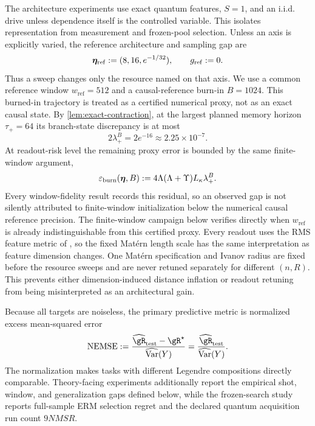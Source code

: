 The architecture experiments use exact quantum features, $S=1$, and an i.i.d.
drive unless dependence itself is the controlled variable.  This isolates
representation from measurement and frozen-pool selection.  Unless an axis is
explicitly varied, the reference architecture and sampling gap are
\begin{equation}
    \bm{\eta}_{\mathrm{ref}}:=(8,16,e^{-1/32}),
    \qquad g_{\mathrm{ref}}:=0.
    \label{eq:empirical-reference-architecture}
\end{equation}
Thus a sweep changes only the resource named on that axis.  We use a common
reference window $w_{\mathrm{ref}}=512$ and a causal-reference burn-in
$B=1024$.  This burned-in trajectory is treated as a certified numerical
proxy, not as an exact causal state.  By \cref{lem:exact-contraction}, at the
largest planned memory horizon $\tau_+=64$ its branch-state discrepancy is at
most
\[
    2\lambda_+^B=2e^{-16}\approx2.25\times10^{-7}.
\]
At readout-risk level the remaining proxy error is bounded by the same
finite-window argument,
\begin{equation}
    \varepsilon_{\mathrm{burn}}(\bm{\eta},B)
    :=4\Lambda(\Lambda+\Upsilon)L_{\kappa}\lambda_+^B.
    \label{eq:burnin-risk-residual}
\end{equation}
Every window-fidelity result records this residual, so an observed gap is not
silently attributed to finite-window initialization below the numerical causal
reference precision.  The finite-window campaign below verifies directly when
$w_{\mathrm{ref}}$ is already indistinguishable from this certified proxy.
Every readout uses the RMS feature metric of , so
the fixed Mat\'ern length scale has the same interpretation as feature
dimension changes.  One Mat\'ern specification and Ivanov radius are fixed
before the resource sweeps and are never retuned separately for different
$(n,R)$.  This prevents either dimension-induced distance inflation or readout
retuning from being misinterpreted as an architectural gain.

Because all targets are noiseless, the primary predictive metric is normalized
excess mean-squared error
\begin{equation}
    \operatorname{NEMSE}
    :=\frac{\widehat \risk_{\mathrm{test}}-\risk^\star}
            {\widehat{\operatorname{Var}}(Y)}
     =\frac{\widehat \risk_{\mathrm{test}}}
            {\widehat{\operatorname{Var}}(Y)}.
    \label{eq:nemse}
\end{equation}
The normalization makes tasks with different Legendre compositions directly
comparable.  Theory-facing experiments additionally report the empirical
shot, window, and generalization gaps defined below, while the frozen-search
study reports full-sample ERM selection regret and the declared quantum
acquisition run count $9NMSR$.

